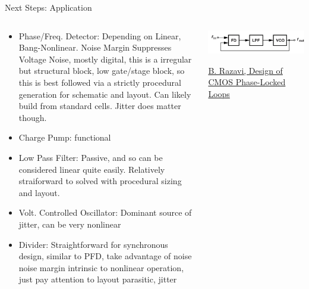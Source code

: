 \begin{frame}{Next Steps: Application}
\protect\hypertarget{next-steps-application}{}
\begin{columns}[T]
\begin{column}{0.48\textwidth}
\begin{itemize}
\tightlist
\item
  Phase/Freq. Detector: Depending on Linear, Bang-Nonlinear. Noise
  Margin Suppresses Voltage Noise, mostly digital, this is a irregular
  but structural block, low gate/stage block, so this is best followed
  via a strictly procedural generation for schematic and layout. Can
  likely build from standard cells. Jitter does matter though.
\item
  Charge Pump: functional
\item
  Low Pass Filter: Passive, and so can be considered linear quite
  easily. Relatively straiforward to solved with procedural sizing and
  layout.
\item
  Volt. Controlled Oscillator: Dominant source of jitter, can be very
  nonlinear
\item
  Divider: Straightforward for synchronous design, similar to PFD, take
  advantage of noise noise margin intrinsic to nonlinear operation, just
  pay attention to layout parasitic, jitter
\end{itemize}
\end{column}

\begin{column}{0.48\textwidth}
\includegraphics{../images/IMG_1502.jpeg}

\href{https://doi.org/10.1017/9781108626200}{B. Razavi, Design of CMOS
Phase-Locked Loops}
\end{column}
\end{columns}
\end{frame}

